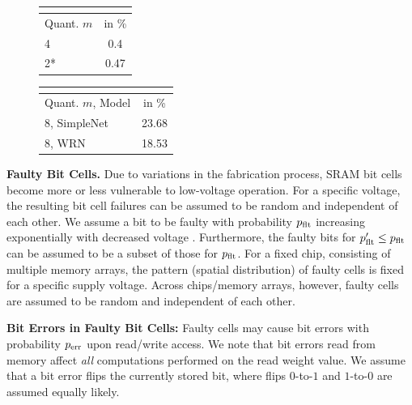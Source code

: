 \begin{table}[t]
	\hspace*{-0.5cm} 
	\begin{subfigure}[t]{0.19\textwidth}
		\vspace*{0px}
		\small
		\begin{tabular}{| l | c |}
			\multicolumn{2}{c}{\bfseries \MNIST}\\
			\hline
			Quant. $m$ & \TE in \%\\
			\hline
			4 & 0.4\\
			2* & 0.47\\
			\hline
		\end{tabular}
	\end{subfigure}
	\begin{subfigure}[t]{0.2\textwidth}
		\vspace*{0px}
		\small
		\begin{tabular}{| l | c |}
			\multicolumn{2}{c}{\bfseries \CifarH}\\
			\hline
			Quant. $m$, Model & \TE in \%\\
			\hline
			8, SimpleNet & 23.68\\
			8, WRN & 18.53\\
			\hline
		\end{tabular}
	\end{subfigure}
	\vspace*{-0.1cm}
\end{table}

\textbf{Faulty Bit Cells.} Due to variations in the fabrication process, SRAM bit cells become more or less vulnerable to low-voltage operation. For a specific voltage, the resulting bit cell failures can be assumed to be random and independent of each other. We assume a bit to be faulty with probability $\pfault$ increasing exponentially with decreased voltage \cite{GanapathyDAC2017,GanapathyHPCA2019,KimDATE2018,ChandramoorthyHPCA2019}. Furthermore, the faulty bits for $\pfault' \leq \pfault$ can be assumed to be a subset of those for $\pfault$. For a fixed chip, consisting of multiple memory arrays, the pattern (spatial distribution) of faulty cells is fixed for a specific supply voltage. Across chips/memory arrays, however, faulty cells are assumed to be random and independent of each other.

\textbf{Bit Errors in Faulty Bit Cells:} Faulty cells may cause bit errors with probability $\perror$ upon read/write access.
We note that bit errors read from memory affect \emph{all} computations performed on the read weight value. 
We assume that a bit error flips the currently stored bit, where flips $0$-to-$1$ and $1$-to-$0$ are assumed equally likely.

